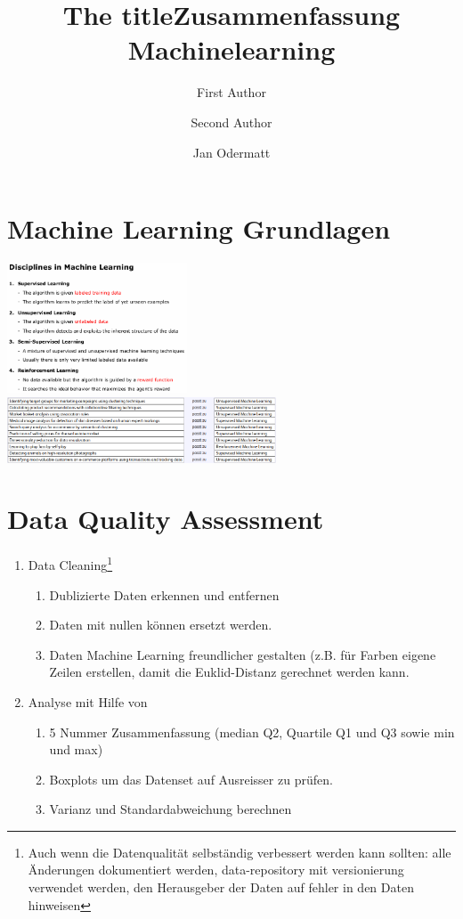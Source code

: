 \documentclass{article}
\author{First Author \and Second Author}
\title{The title}
\author{Jan Odermatt}
\title{Zusammenfassung Machinelearning}
\begin{document}
\tableofcontents
\section{Machine Learning Grundlagen}
\includegraphics[width=0.4\textwidth]{disciplines_in_machine_learning.png}
\includegraphics[width=0.6\textwidth]{disciplines_matched.png}
\section{Data Quality Assessment}
	\begin{enumerate}
		\item Data Cleaning\footnote{Auch wenn die Datenqualität selbständig verbessert werden kann sollten: alle Änderungen dokumentiert werden, data-repository mit versionierung verwendet werden, den Herausgeber der Daten auf fehler in den Daten hinweisen}
		\begin{enumerate}
			\item Dublizierte Daten erkennen und entfernen
			\item Daten mit nullen können ersetzt werden.
			\item Daten Machine Learning freundlicher gestalten (z.B. für Farben eigene Zeilen erstellen, damit die Euklid-Distanz gerechnet werden kann.
		\end{enumerate}
		\item Analyse mit Hilfe von
		\begin{enumerate}
		\item 5 Nummer Zusammenfassung (median Q2, Quartile Q1 und Q3 sowie min und max)
		\item Boxplots um das Datenset auf Ausreisser zu prüfen.
		\item Varianz und Standardabweichung berechnen
		\end{enumerate}
	\end{enumerate}
\end{document}
